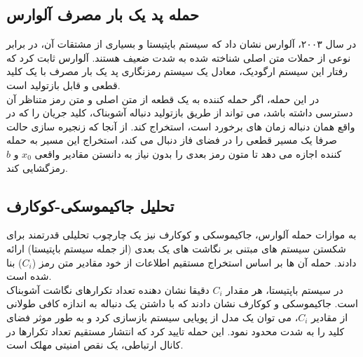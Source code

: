 \documentclass[12pt]{report}
\begin{document}
\subsection[حمله پد یک بار مصرف آلوارس]{حمله پد یک بار مصرف آلوارس}
در سال ۲۰۰۳، آلوارس نشان داد که سیستم باپتیستا و بسیاری از 
مشتقات آن، در برابر نوعی از حملات متن اصلی شناخته شده 
به شدت ضعیف هستند. آلوارس ثابت کرد که رفتار این سیستم ارگودیک، معادل یک سیستم رمزنگاری پد یک 
بار مصرف با یک کلید قطعی و قابل بازتولید است.
\\\noindent
در این حمله، اگر حمله کننده به یک قطعه از متن اصلی و متن رمز متناظر آن دسترسی داشته باشد، 
می تواند از طریق بازتولید دنباله آشوبناک، کلید جریان را که در 
واقع همان دنباله زمان های برخورد است، استخراج کند. از آنجا که زنجیره سازی حالت
 صرفا یک مسیر قطعی را در فضای فاز دنبال می کند، استخراج این 
مسیر به حمله کننده اجازه می دهد تا متون رمز بعدی را بدون نیاز به دانستن مقادیر واقعی $x_0$ 
و $b$ رمزگشایی کند.

\subsection[تحلیل جاکیموسکی-کوکارف]{تحلیل جاکیموسکی-کوکارف}
به موازات حمله آلوارس، جاکیموسکی و کوکارف نیز یک چارچوب تحلیلی قدرتمند برای شکستن سیستم های 
مبتنی بر نگاشت های یک بعدی (از جمله سیستم باپتیستا) ارائه دادند. حمله آن ها بر اساس استخراج 
مستقیم اطلاعات از خود مقادیر متن رمز ($C_i$) بنا شده است. 
\\\noindent
در سیستم باپتیستا، هر مقدار $C_i$ دقیقا نشان دهنده تعداد تکرارهای نگاشت آشوبناک است. جاکیموسکی 
و کوکارف نشان دادند که با داشتن یک دنباله به اندازه کافی طولانی از مقادیر $C_i$، می توان یک مدل 
از پویایی سیستم بازسازی کرد و به طور موثر فضای کلید را به شدت محدود نمود. این حمله تایید کرد که 
انتشار مستقیم تعداد تکرارها در کانال ارتباطی، یک نقص امنیتی مهلک است.
\end{document}
